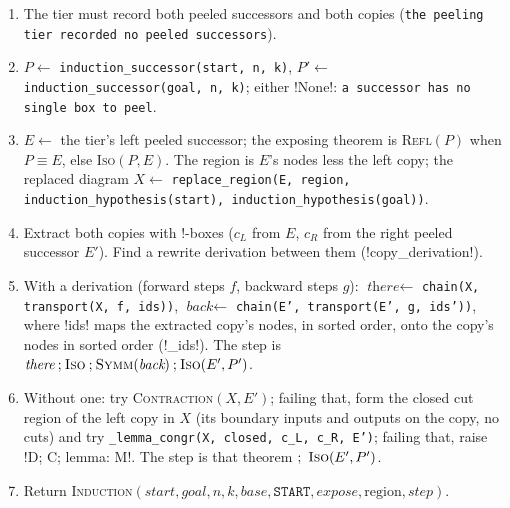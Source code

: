 \begin{algorithm}\label{alg:kernel-peeled-theorem}
\begin{enumerate}
\item The tier must record both peeled successors and both copies (\texttt{the peeling tier recorded no peeled successors}).
\item $P\gets$ \texttt{induction\_\allowbreak{}successor(\allowbreak{}start,\allowbreak{} n,\allowbreak{} k)}, $P'\gets$ \texttt{induction\_\allowbreak{}successor(\allowbreak{}goal,\allowbreak{} n,\allowbreak{} k)}; either \py!None!: \texttt{a successor has no single box to peel}.
\item $E\gets$ the tier's left peeled successor; the exposing theorem is \textsc{Refl}$(P)$ when $P\equiv E$, else \textsc{Iso}$(P,E)$. The region is $E$'s nodes less the left copy; the replaced diagram $X\gets$ \texttt{replace\_\allowbreak{}region(\allowbreak{}E,\allowbreak{} region,\allowbreak{} induction\_\allowbreak{}hypothesis(\allowbreak{}start),\allowbreak{} induction\_\allowbreak{}hypothesis(\allowbreak{}goal))}.
\item Extract both copies with !-boxes ($c_L$ from $E$, $c_R$ from the right peeled successor $E'$). Find a rewrite derivation between them (\py!copy_derivation!).
\item With a derivation (forward steps $f$, backward steps $g$): $\textit{there}\gets$ \texttt{chain(\allowbreak{}X,\allowbreak{} transport(\allowbreak{}X,\allowbreak{} f,\allowbreak{} ids))}, $\textit{back}\gets$ \texttt{chain(\allowbreak{}E',\allowbreak{} transport(\allowbreak{}E',\allowbreak{} g,\allowbreak{} ids'))}, where \code!ids! maps the extracted copy's nodes, in sorted order, onto the copy's nodes in sorted order (\py!_ids!). The step is $\textit{there}\mathbin{;}\textsc{Iso}\mathbin{;}\textsc{Symm}(\textit{back})\mathbin{;}\textsc{Iso}(E',P')$.
\item Without one: try \textsc{Contraction}$(X, E')$; failing that, form the closed cut region of the left copy in $X$ (its boundary inputs and outputs on the copy, no cuts) and try \texttt{\_\allowbreak{}lemma\_\allowbreak{}congr(\allowbreak{}X,\allowbreak{} closed,\allowbreak{} c\_\allowbreak{}L,\allowbreak{} c\_\allowbreak{}R,\allowbreak{} E')}; failing that, raise \code!D; C; lemma: M!. The step is that theorem $;\ \textsc{Iso}(E',P')$.
\item Return \textsc{Induction}$(\textit{start},\textit{goal},n,k,\textit{base},\texttt{START},\textit{expose},\text{region},\textit{step})$.
\end{enumerate}
\end{algorithm}

